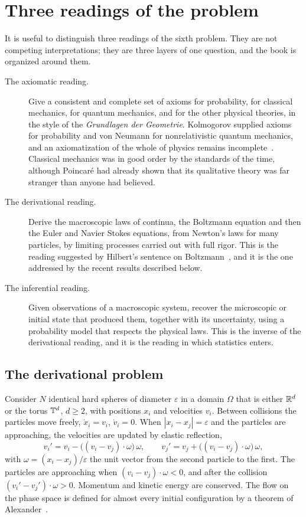 \section{Three readings of the problem}

It is useful to distinguish three readings of the sixth problem. They are not competing interpretations; they are three layers of one question, and the book is organized around them.

\begin{description}
\item[The axiomatic reading.] Give a consistent and complete set of axioms for probability, for classical mechanics, for quantum mechanics, and for the other physical theories, in the style of the \emph{Grundlagen der Geometrie}. Kolmogorov supplied axioms for probability and von Neumann for nonrelativistic quantum mechanics, and an axiomatization of the whole of physics remains incomplete~\cite{gorban2018}. Classical mechanics was in good order by the standards of the time, although Poincar\'e had already shown that its qualitative theory was far stranger than anyone had believed.
\item[The derivational reading.] Derive the macroscopic laws of continua, the Boltzmann equation and then the Euler and Navier Stokes equations, from Newton's laws for many particles, by limiting processes carried out with full rigor. This is the reading suggested by Hilbert's sentence on Boltzmann~\cite{gorban2018}, and it is the one addressed by the recent results described below.
\item[The inferential reading.] Given observations of a macroscopic system, recover the microscopic or initial state that produced them, together with its uncertainty, using a probability model that respects the physical laws. This is the inverse of the derivational reading, and it is the reading in which statistics enters.
\end{description}

\subsection{The derivational problem}

Consider $N$ identical hard spheres of diameter $\varepsilon$ in a domain $\Omega$ that is either $\mathbb{R}^d$ or the torus $\mathbb{T}^d$, $d\geq 2$, with positions $x_i$ and velocities $v_i$. Between collisions the particles move freely, $\dot x_i = v_i$, $\dot v_i = 0$. When $|x_i - x_j| = \varepsilon$ and the particles are approaching, the velocities are updated by elastic reflection,
\begin{equation}
v_i' = v_i - \big((v_i - v_j)\cdot\omega\big)\,\omega,\qquad
v_j' = v_j + \big((v_i - v_j)\cdot\omega\big)\,\omega,
\label{eq:hs_collision}
\end{equation}
with $\omega = (x_i - x_j)/\varepsilon$ the unit vector from the second particle to the first. The particles are approaching when $(v_i - v_j)\cdot\omega<0$, and after the collision $(v_i' - v_j')\cdot\omega>0$. Momentum and kinetic energy are conserved. The flow on the phase space is defined for almost every initial configuration by a theorem of Alexander~\cite{alexander1975}.

